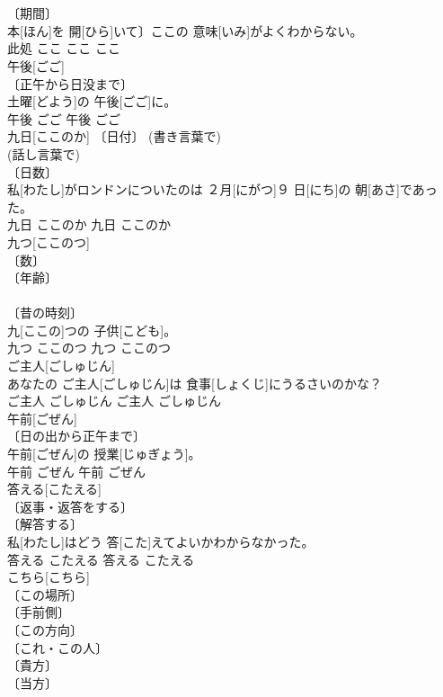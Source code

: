 \documentclass[8pt]{extreport}
\begin{document}
\begin{CJK}{UTF8}{min}
\\	[⇒ここいちばん, ここぞ] 
\\	〔期間〕	
\\	本[ほん]を 開[ひら]いて〕ここの 意味[いみ]がよくわからない。	
\\	此処	ここ	ここ	ここ	
\\	午後[ごご]	
\\	〔正午から日没まで〕 
\\	土曜[どよう]の 午後[ごご]に。	
\\	午後	ごご	午後	ごご	
\\	九日[ここのか]	〔日付〕 (書き言葉で) 
\\	(話し言葉で) 
\\	〔日数〕 
\\	私[わたし]がロンドンについたのは ２月[にがつ]９ 日[にち]の 朝[あさ]であった。	
\\	九日	ここのか	九日	ここのか	
\\	九つ[ここのつ]	
\\	〔数〕 
\\	〔年齢〕 
\\	[＝く１] 
\\	〔昔の時刻〕 
\\	九[ここの]つの 子供[こども]。	
\\	九つ	ここのつ	九つ	ここのつ	
\\	ご主人[ごしゅじん]	
\\	あなたの ご主人[ごしゅじん]は 食事[しょくじ]にうるさいのかな？	
\\	ご主人	ごしゅじん	ご主人	ごしゅじん	
\\	午前[ごぜん]	
\\	〔日の出から正午まで〕 
\\	午前[ごぜん]の 授業[じゅぎょう]。	
\\	午前	ごぜん	午前	ごぜん	
\\	答える[こたえる]	
\\	〔返事・返答をする〕 
\\	〔解答する〕 
\\	私[わたし]はどう 答[こた]えてよいかわからなかった。	
\\	答える	こたえる	答える	こたえる	
\\	こちら[こちら]	
\\	〔この場所〕 
\\	〔手前側〕 
\\	〔この方向〕 
\\	〔これ・この人〕 
\\	〔貴方〕 
\\	〔当方〕 

\end{CJK}
\end{document}
